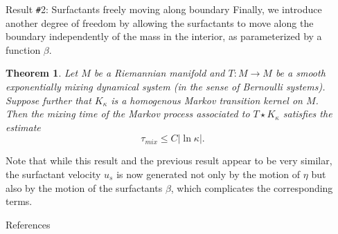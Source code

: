 \documentclass[final,noamsthm]{beamer}
\newtheorem{thm}{Theorem}
\newcommand{\abs}[1]{\left\vert #1\right\vert}
\newlength{\sepwidth}
\newlength{\colwidth}
\newcommand{\separatorcolumn}{\begin{column}{\sepwidth}\end{column}}
\begin{document}
\begin{frame}[t]
\begin{columns}[t]
        \begin{column}{\colwidth}
            \vspace{-1.5cm}

            \begin{block} {Result \texttt{\#}2: Surfactants freely moving along boundary}
                Finally, we introduce another degree of freedom by allowing the surfactants to move along the boundary independently of the mass in the interior, as parameterized by a function $\beta$.
                \begin{thm}
Let $M$ be a Riemannian manifold and $T: M \to M$ be a smooth exponentially mixing dynamical system (in the sense of Bernoulli systems).
			Suppose further that $K_\kappa$ is a homogenous Markov transition kernel on $M$.
			Then the mixing time of the Markov process associated to $T \star K_\kappa$ satisfies the estimate
			\[
				\tau_{mix} \le C\abs{\ln \kappa}.
			\]

                \end{thm}


                Note that while this result and the previous result appear to be very similar, the surfactant velocity $u_s$ is now generated not only by the motion of $\eta$ but also by the motion of the surfactants $\beta$, which complicates the corresponding terms. %
            \end{block}

            \begin{block}{References}
                \vspace{-0.3em}
                {
                    \small
                    \nocite{*}
                    \begin{multicols}{2}
                        
                        
                \end{multicols}}
            \end{block}
        \end{column}
        \separatorcolumn
    \end{columns}
\end{frame}
\end{document}
